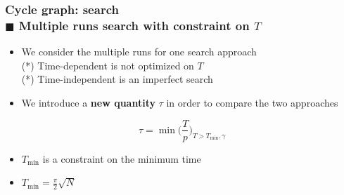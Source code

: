 \documentclass{beamer}
\newcommand{\bb}[1]{\textbf{\textcolor{darkish_blue}{#1}}}
\begin{document}

\begin{frame}
\frametitle{Cycle graph: search \\ \normalsize $\blacksquare$ Multiple runs search with constraint on $T$}

\begin{itemize}
	\item We consider the multiple runs for one search approach\\(*) Time-dependent is not optimized on $T$ \\(*) Time-independent is an imperfect search
	\item We introduce a \bb{new quantity} $\tau$ in order to compare the two approaches
\end{itemize}
\vspace{0.3cm}

\centering
\begin{tcolorbox}[width=4.0cm, colframe=darkblue, colback=white, halign=center, left=1pt, right=1pt, top=-11pt, bottom=1pt]
	\begin{equation*}
		\tau = \min \Big(\frac{T}{p}\Big)_{T>T_{\min}, \gamma}
	\end{equation*}
\end{tcolorbox}


\vspace{0.3cm}
\begin{itemize}
	\item $T_{\min}$ is a constraint on the minimum time
	\item $T_{\min} = \frac{\pi}{2}\sqrt{N}$
\end{itemize}
\end{frame}

\end{document}
